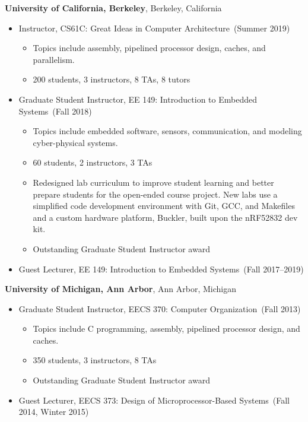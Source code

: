 \documentclass{article}
\begin{document}
\newpage

{\bf University of California, Berkeley}, Berkeley, California
\vspace{-6pt}
\begin{itemize}
  \item[] Instructor, CS61C: Great Ideas in Computer Architecture~(Summer 2019)
    \vspace{-\topsep}
    \vspace{\itemsep}
    \begin{itemize}
      \item Topics include assembly, pipelined processor design, caches, and parallelism.
      \item 200 students, 3 instructors, 8 TAs, 8 tutors
    \end{itemize}
  \item[] Graduate Student Instructor, EE 149: Introduction to Embedded Systems~(Fall 2018)
    \vspace{-\topsep}
    \vspace{\itemsep}
    \begin{itemize}
      \item Topics include embedded software, sensors, communication, and modeling cyber-physical systems.
      \item 60 students, 2 instructors, 3 TAs
      \item Redesigned lab curriculum to improve student learning and better
        prepare students for the open-ended course project. New labs use a
        simplified code development environment  with Git, GCC, and Makefiles
        and a custom hardware platform, Buckler, built upon the nRF52832 dev
        kit.
      \item Outstanding Graduate Student Instructor award
    \end{itemize}
  \item[] Guest Lecturer, EE 149: Introduction to Embedded Systems~(Fall 2017--2019)
\end{itemize}

{\bf University of Michigan, Ann Arbor}, Ann Arbor, Michigan
\vspace{-6pt}
\begin{itemize}
  \item[] Graduate Student Instructor, EECS 370: Computer Organization~(Fall 2013)
    \vspace{-\topsep}
    \vspace{\itemsep}
    \begin{itemize}
      \item Topics include C programming, assembly, pipelined processor design, and  caches.
      \item 350 students, 3 instructors, 8 TAs
      \item Outstanding Graduate Student Instructor award
    \end{itemize}
  \item[] Guest Lecturer, EECS 373: Design of Microprocessor-Based Systems~(Fall 2014, Winter 2015)
\end{itemize}
\end{document}
